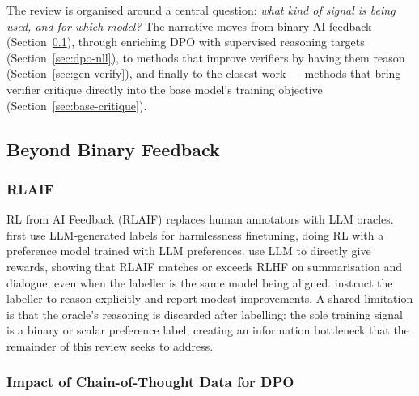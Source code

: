 \documentclass[11pt]{article}
\begin{document}
The review is organised around a central question: \textit{what kind of signal is being used, and for which model?} The narrative moves from binary AI feedback (Section~\ref{sec:cot-motivation}), through enriching DPO with supervised reasoning targets (Section~\ref{sec:dpo-nll}), to methods that improve verifiers by having them reason (Section~\ref{sec:gen-verify}), and finally to the closest work --- methods that bring verifier critique directly into the base model's training objective (Section~\ref{sec:base-critique}).

\subsection{Beyond Binary Feedback}
\label{sec:cot-motivation}

\subsubsection{RLAIF}

RL from AI Feedback (RLAIF) replaces human annotators with LLM oracles. \autocite{bai2022constitutionalaiharmlessnessai} first use LLM-generated labels for harmlessness finetuning, doing RL with a preference model trained with LLM preferences. \autocite{lee2024rlaifvsrlhfscaling} use LLM to directly give rewards, showing that RLAIF matches or exceeds RLHF on summarisation and dialogue, even when the labeller is the same model being aligned. \autocite{li2024hrlaifimprovementshelpfulnessharmlessness} instruct the labeller to reason explicitly and report modest improvements. A shared limitation is that the oracle's reasoning is discarded after labelling: the sole training signal is a binary or scalar preference label, creating an information bottleneck that the remainder of this review seeks to address.

\subsubsection{Impact of Chain-of-Thought Data for DPO}
\label{sec:cot-dpo}
\end{document}

